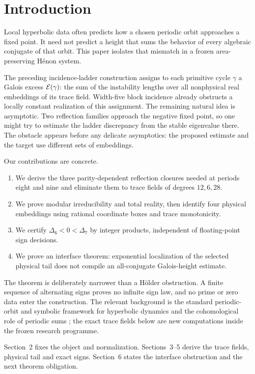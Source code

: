 \section{Introduction}

Local hyperbolic data often predicts how a chosen periodic orbit approaches a
fixed point.  It need not predict a height that sums the behavior of every
algebraic conjugate of that orbit.  This paper isolates that mismatch in a
frozen area-preserving H\'enon system.

The preceding incidence-ladder construction assigns to each primitive cycle
\(\gamma\) a Galois excess \(\mathcal E(\gamma)\): the sum of the instability
lengths over all nonphysical real embeddings of its trace field.  Width-five
block incidence already obstructs a locally constant realization of this
assignment.  The remaining natural idea is asymptotic.  Two reflection
families approach the negative fixed point, so one might try to estimate the
ladder discrepancy from the stable eigenvalue there.  The obstacle appears
before any delicate asymptotics: the proposed estimate and the target use
different sets of embeddings.

Our contributions are concrete.
\begin{enumerate}
\item We derive the three parity-dependent reflection closures needed at
periods eight and nine and eliminate them to trace fields of degrees
\(12,6,28\).
\item We prove modular irreducibility and total reality, then identify four
physical embeddings using rational coordinate boxes and trace monotonicity.
\item We certify \(\Delta_6<0<\Delta_7\) by integer products, independent of
floating-point sign decisions.
\item We prove an interface theorem: exponential localization of the selected
physical tail does not compile an all-conjugate Galois-height estimate.
\end{enumerate}

The theorem is deliberately narrower than a H\"older obstruction.  A finite
sequence of alternating signs proves no infinite sign law, and no prime or
zero data enter the construction.  The relevant background is the standard
periodic-orbit and symbolic framework for hyperbolic dynamics
\citep{Bowen1975,ParryPollicott1990} and the cohomological role of periodic
sums \citep{Livshits1972}; the exact trace fields below are new computations
inside the frozen research programme.

Section~2 fixes the object and normalization.  Sections~3--5 derive the trace
fields, physical tail and exact signs.  Section~6 states the interface
obstruction and the next theorem obligation.
